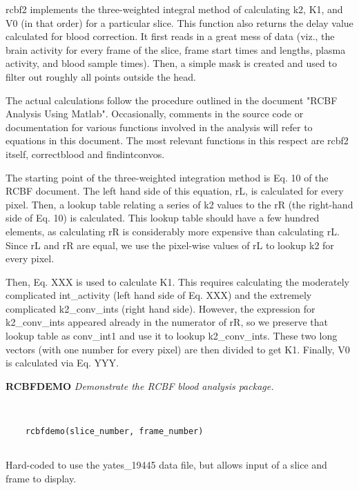   rcbf2 implements the three-weighted integral method of calculating
  k2, K1, and V0 (in that order) for a particular slice.  This
  function also returns the delay value calculated for blood
  correction.  It first reads in a great mess of data (viz., the brain
  activity for every frame of the slice, frame start times and
  lengths, plasma activity, and blood sample times).  Then, a simple
  mask is created and used to filter out roughly all points outside
  the head.
  
  The actual calculations follow the procedure outlined in the
  document "RCBF Analysis Using Matlab".  Occasionally, comments in
  the source code or documentation for various functions involved in
  the analysis will refer to equations in this document.  The most
  relevant functions in this respect are rcbf2 itself, correctblood
  and findintconvos.
  
  The starting point of the three-weighted integration method is Eq.
  10 of the RCBF document.  The left hand side of this equation, rL,
  is calculated for every pixel.  Then, a lookup table relating a
  series of k2 values to the rR (the right-hand side of Eq. 10) is
  calculated.  This lookup table should have a few hundred elements,
  as calculating rR is considerably more expensive than calculating
  rL.  Since rL and rR are equal, we use the pixel-wise values of rL
  to lookup k2 for every pixel.
  
  Then, Eq. XXX is used to calculate K1.  This requires calculating
  the moderately complicated int\_activity (left hand side of Eq. XXX)
  and the extremely complicated k2\_conv\_ints (right hand side).
  However, the expression for k2\_conv\_ints appeared already in the
  numerator of rR, so we preserve that lookup table as conv\_int1 and
  use it to lookup k2\_conv\_ints.  These two long vectors (with one
  number for every pixel) are then divided to get K1.  Finally, V0 is
  calculated via Eq. YYY.
\newpage


{\large\bf RCBFDEMO} {\em Demonstrate the RCBF blood analysis package.}
\begin{verbatim}


    rcbfdemo(slice_number, frame_number)


\end{verbatim}

  Hard-coded to use the yates\_19445 data
  file, but allows input of a slice and
  frame to display.
\newpage


